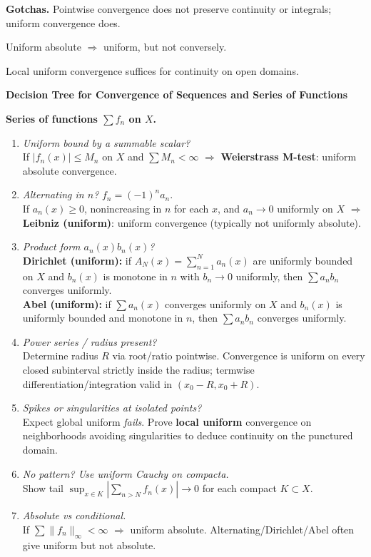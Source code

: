 \documentclass[12pt,a4paper]{article}
\theoremstyle{plain}
\theoremstyle{definition}
\theoremstyle{remark}
\theoremstyle{remark}
\newcommand{\probheader}[1]{%
	\par\vspace{8pt}%
	{\Large\bfseries #1\par}%
	\vspace{6pt}%
}
\begin{document}
	\textbf{Gotchas.}
	Pointwise convergence does not preserve continuity or integrals;
	 uniform convergence does.
	
	Uniform absolute $\Rightarrow$ uniform, but not conversely.
	
	Local uniform convergence suffices for continuity on open domains.
	
	
	
	\probheader{Decision Tree for Convergence of Sequences and Series of Functions}
	
	\textbf{Series of functions $\sum f_n$ on $X$.}
	\begin{enumerate}[leftmargin=1.2cm,label=\arabic*)]
		\item \textit{Uniform bound by a summable scalar?} \\
		If $|f_n(x)|\le M_n$ on $X$ and $\sum M_n<\infty$ $\Rightarrow$ \textbf{Weierstrass M-test}:
		uniform absolute convergence.
		
		\item \textit{Alternating in $n$?} $f_n=(-1)^n a_n$. \\
		If $a_n(x)\ge0$, nonincreasing in $n$ for each $x$, and $a_n\to0$ uniformly on $X$ $\Rightarrow$
		\textbf{Leibniz (uniform)}: uniform convergence (typically not uniformly absolute).
		
		\item \textit{Product form $a_n(x)b_n(x)$?} \\
		\textbf{Dirichlet (uniform):} if $A_N(x)=\sum_{n=1}^N a_n(x)$ are uniformly bounded on $X$ and
		$b_n(x)$ is monotone in $n$ with $b_n\to0$ uniformly, then $\sum a_n b_n$ converges uniformly. \\
		\textbf{Abel (uniform):} if $\sum a_n(x)$ converges uniformly on $X$ and $b_n(x)$ is uniformly bounded
		and monotone in $n$, then $\sum a_n b_n$ converges uniformly.
		
		\item \textit{Power series / radius present?} \\
		Determine radius $R$ via root/ratio pointwise. Convergence is uniform on every closed subinterval
		strictly inside the radius; termwise differentiation/integration valid in $(x_0-R,x_0+R)$.
		
		\item \textit{Spikes or singularities at isolated points?} \\
		Expect global uniform \emph{fails}. Prove \textbf{local uniform} convergence on neighborhoods avoiding singularities
		to deduce continuity on the punctured domain.
		
		\item \textit{No pattern? Use uniform Cauchy on compacta.} \\
		Show tail $\sup_{x\in K}|\sum_{n>N} f_n(x)|\to0$ for each compact $K\subset X$.
		
		\item \textit{Absolute vs conditional.} \\
		If $\sum \|f_n\|_\infty<\infty$ $\Rightarrow$ uniform absolute. Alternating/Dirichlet/Abel often give uniform but not absolute.
	\end{enumerate}
	
\end{document}
